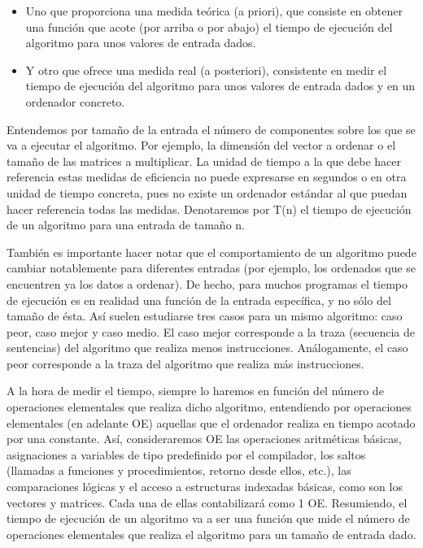 		\begin{itemize}
		  \item Uno que proporciona una medida teórica (a priori), que consiste en obtener una  función que acote (por arriba o por abajo) el tiempo de
		  ejecución del algoritmo para unos valores de entrada dados.
		\item Y otro que ofrece una medida real (a posteriori), consistente en medir el tiempo  de ejecución del algoritmo para unos valores de entrada
		dados y en un ordenador concreto. 
		\end{itemize} 
		
		Entendemos por tamaño de la entrada el número de componentes sobre los que  se va a ejecutar el algoritmo. Por ejemplo, la dimensión del vector a
		ordenar o el tamaño de las matrices a multiplicar. La unidad de tiempo a la que debe hacer referencia estas medidas de eficiencia  no puede 
		expresarse en segundos o en otra unidad de tiempo concreta, pues no existe un ordenador estándar al que puedan hacer referencia todas las medidas. 
        Denotaremos por T(n) el tiempo de ejecución de un algoritmo para una entrada de tamaño n. 
        
        También es importante hacer notar que el comportamiento de un algoritmo puede cambiar notablemente para diferentes entradas (por ejemplo, los
        ordenados que se encuentren ya los datos a ordenar). De hecho, para muchos programas el tiempo de ejecución es en realidad una función de la
        entrada específica, y no sólo del tamaño de ésta. Así suelen estudiarse tres casos para un mismo algoritmo: caso peor, caso mejor y caso
        medio. El caso mejor corresponde a la traza (secuencia de sentencias) del algoritmo que realiza menos instrucciones. Análogamente, el caso
        peor corresponde a la traza del algoritmo que realiza más instrucciones.
 		
 		A la hora de medir el tiempo, siempre lo haremos en función del número de operaciones elementales que realiza dicho algoritmo, entendiendo por
 		operaciones elementales (en adelante OE) aquellas que el ordenador realiza en tiempo acotado por una constante. Así, consideraremos OE las
 		operaciones aritméticas básicas,  asignaciones a variables de tipo predefinido por el compilador, los saltos (llamadas a funciones y
 		procedimientos, retorno desde ellos, etc.), las comparaciones lógicas y el acceso a estructuras indexadas básicas, como son los vectores y
 		matrices. Cada una de ellas contabilizará como 1 OE. Resumiendo, el tiempo de ejecución de un algoritmo va a ser una función que mide el número de
 		operaciones elementales que realiza el algoritmo para un tamaño de entrada dado.
		
